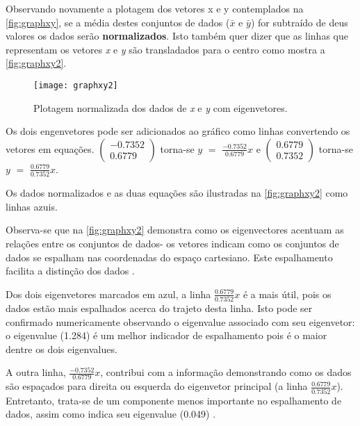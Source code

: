 Observando novamente a plotagem dos vetores x e y contemplados na \autoref{fig:graphxy}, se a média destes conjuntos de dados ($\bar{x}$ e $\bar{y}$) for subtraído de deus valores os dados serão \textbf{normalizados}. Isto também quer dizer que as linhas que representam os vetores \textit{x} e \textit{y} são transladados para o centro como mostra a \autoref{fig:graphxy2}. 

\begin{figure}[h]
	\centering
	\texttt{[image: graphxy2]}
	\caption{Plotagem normalizada dos dados de \textit{x} e \textit{y} com eigenvetores.}
	\label{fig:graphxy2}
\end{figure}

Os dois engenvetores pode ser adicionados ao gráfico como linhas convertendo os vetores em equações. 
$\begin{pmatrix} -0.7352 \\ 0.6779 \end{pmatrix}$ torna-se $y$ $=$ $\frac{-0.7352}{0.6779}$$x$  e $\begin{pmatrix} 0.6779 \\ 0.7352 \end{pmatrix}$ torna-se $y$ $=$ $\frac{0.6779}{0.7352}$$x$.

Os dados normalizados e as duas equações são ilustradas na \autoref{fig:graphxy2} como linhas azuis. 

Observa-se que na \autoref{fig:graphxy2} demonstra como os eigenvectores acentuam as relações entre os conjuntos de dados- os vetores indicam como os conjuntos de dados se espalham nas coordenadas do espaço cartesiano. Este espalhamento facilita a distinção dos dados \cite{drmathew_java_programming}.

Dos dois eigenvetores marcados em azul, a linha $\frac{0.6779}{0.7352}$$x$ é a mais útil, pois os dados estão mais espalhados acerca do trajeto desta linha. Isto pode ser confirmado numericamente observando o eigenvalue associado com seu eigenvetor: o eigenvalue (1.284) é um melhor indicador de espalhamento pois é o maior dentre os dois eigenvalues.

A outra linha, $\frac{-0.7352}{0.6779}$$x$, contribui com a informação demonstrando como os dados são espaçados para direita ou esquerda do eigenvetor principal (a linha $\frac{0.6779}{0.7352}$$x$). Entretanto, trata-se de um componente menos importante no espalhamento de dados, assim como indica seu eigenvalue (0.049) \cite{drmathew_java_programming}.

